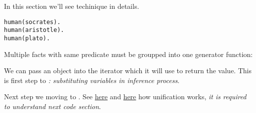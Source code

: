 \label{yield}

In this section we'll see \href{http://yieldprolog.sourceforge.net/}{\yp}
techinique in details.

\begin{verbatim}
human(socrates).
human(aristotle).
human(plato).
\end{verbatim}

Multiple facts with same predicate must be groupped into one generator function: 



\clearpage

We can pass an object into the iterator which it will use to return the value.
This is first step to \emph{: substituting variables in
inference process}.


Next step we moving to . See
\href{http://www.amzi.com/articles/prolog_under_the_hood.htm}{here} and
\href{http://www.learnprolognow.org/lpnpage.php?pagetype=html&pageid=lpn-htmlse5}{here} 
how unification works, \emph{it is required to understand next code section}.


